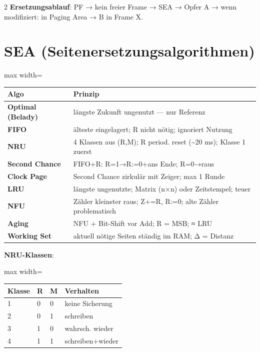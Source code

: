 \documentclass[10pt, a4paper]{article}
\begin{document}
\begin{multicols}{2}
\textbf{Ersetzungsablauf}: PF → kein freier Frame → SEA → Opfer A → wenn modifiziert: in Paging Area → B in Frame X.



\section{SEA (Seitenersetzungsalgorithmen)}


{\small
\begin{adjustbox}{max width=\linewidth}
{\scriptsize
\begin{tabular}{ll}
\toprule
\textbf{Algo} & \textbf{Prinzip} \\
\midrule
\textbf{Optimal (Belady)} & längste Zukunft ungenutzt — nur Referenz \\
\textbf{FIFO} & älteste eingelagert; R nicht nötig; ignoriert Nutzung \\
\textbf{NRU} & 4 Klassen aus (R,M); R period. reset (\textasciitilde{}20 ms); Klasse 1 zuerst \\
\textbf{Second Chance} & FIFO+R: R=1→R:=0+ans Ende; R=0→raus \\
\textbf{Clock Page} & Second Chance zirkulär mit Zeiger; max 1 Runde \\
\textbf{LRU} & längste ungenutzte; Matrix (n×n) oder Zeitstempel; teuer \\
\textbf{NFU} & Zähler kleinster raus; Z+=R, R:=0; alte Zähler problematisch \\
\textbf{Aging} & NFU + Bit-Shift vor Add; R = MSB; ≈ LRU \\
\textbf{Working Set} & aktuell nötige Seiten ständig im RAM; Δ = Distanz \\
\bottomrule
\end{tabular}
}
\end{adjustbox}
}


\textbf{NRU-Klassen}:


{\small
\begin{adjustbox}{max width=\linewidth}
{\scriptsize
\begin{tabular}{llll}
\toprule
\textbf{Klasse} & \textbf{R} & \textbf{M} & \textbf{Verhalten} \\
\midrule
1 & 0 & 0 & keine Sicherung \\
2 & 0 & 1 & schreiben \\
3 & 1 & 0 & wahrsch. wieder \\
4 & 1 & 1 & schreiben+wieder \\
\bottomrule
\end{tabular}
}
\end{adjustbox}
}



\end{multicols}
\end{document}
